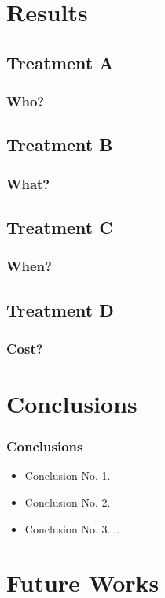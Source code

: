 \documentclass[t,10pt]{beamer}
\begin{document}
\section{Results}
\subsection{Treatment A}

\begin{frame}
  \frametitle{Who?}
\end{frame}

\subsection{Treatment B}
\begin{frame}
  \frametitle{What?}
\end{frame}

\subsection{Treatment C}
\begin{frame}
  \frametitle{When?}
\end{frame}

\subsection{Treatment D}
\begin{frame}
  \frametitle{Cost?}
\end{frame}
\section{Conclusions}

\begin{frame}
  \frametitle{Conclusions}
  \begin{itemize}
      \item{Conclusion No. 1.}
      \item{Conclusion No. 2.}
      \item{Conclusion No. 3....} 
  \end{itemize}
\end{frame}

\section{Future Works}
\end{document}
